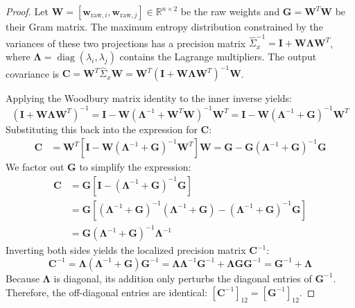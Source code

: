 \documentclass[11pt, a4paper, copyright, gdm]{google}
\newcommand{\wVect}{\boldsymbol{w}}
\newcommand{\R}{\mathbb{R}}
\newcommand{\Cmat}{\boldsymbol{C}}
\newcommand{\Gmat}{\boldsymbol{G}}
\newcommand{\Imat}{\boldsymbol{I}}
\newcommand{\Wmat}{\boldsymbol{W}}
\newcommand{\Lambdamat}{\boldsymbol{\Lambda}}
\DeclareMathOperator{\diag}{diag}
\theoremstyle{definition}
\begin{document}
\begin{proof}
Let $\Wmat = [\wVect_{\text{raw},i}, \wVect_{\text{raw},j}] \in \R^{n \times 2}$ be the raw weights and $\Gmat = \Wmat^T \Wmat$ be their Gram matrix. The maximum entropy distribution constrained by the variances of these two projections has a precision matrix $\hat{\Sigma}_x^{-1} = \Imat + \Wmat \Lambdamat \Wmat^T$, where $\Lambdamat = \diag(\lambda_i, \lambda_j)$ contains the Lagrange multipliers. The output covariance is $\Cmat = \Wmat^T \hat{\Sigma}_x \Wmat = \Wmat^T (\Imat + \Wmat \Lambdamat \Wmat^T)^{-1} \Wmat$. 

Applying the Woodbury matrix identity to the inner inverse yields:
\begin{equation*}
    (\Imat + \Wmat \Lambdamat \Wmat^T)^{-1} = \Imat - \Wmat (\Lambdamat^{-1} + \Wmat^T \Wmat)^{-1} \Wmat^T = \Imat - \Wmat (\Lambdamat^{-1} + \Gmat)^{-1} \Wmat^T
\end{equation*}
Substituting this back into the expression for $\Cmat$:
\begin{align*}
    \Cmat &= \Wmat^T \left[ \Imat - \Wmat (\Lambdamat^{-1} + \Gmat)^{-1} \Wmat^T \right] \Wmat = \Gmat - \Gmat (\Lambdamat^{-1} + \Gmat)^{-1} \Gmat
\end{align*}
We factor out $\Gmat$ to simplify the expression:
\begin{align*}
    \Cmat &= \Gmat \left[ \Imat - (\Lambdamat^{-1} + \Gmat)^{-1} \Gmat \right] \\
    &= \Gmat \left[ (\Lambdamat^{-1} + \Gmat)^{-1} (\Lambdamat^{-1} + \Gmat) - (\Lambdamat^{-1} + \Gmat)^{-1} \Gmat \right] \\
    &= \Gmat (\Lambdamat^{-1} + \Gmat)^{-1} \Lambdamat^{-1}
\end{align*}
Inverting both sides yields the localized precision matrix $\Cmat^{-1}$:
\begin{equation*}
    \Cmat^{-1} = \Lambdamat (\Lambdamat^{-1} + \Gmat) \Gmat^{-1} = \Lambdamat \Lambdamat^{-1} \Gmat^{-1} + \Lambdamat \Gmat \Gmat^{-1} = \Gmat^{-1} + \Lambdamat
\end{equation*}
Because $\Lambdamat$ is diagonal, its addition only perturbs the diagonal entries of $\Gmat^{-1}$. Therefore, the off-diagonal entries are identical: $[\Cmat^{-1}]_{12} = [\Gmat^{-1}]_{12}$.


\end{proof}
\end{document}
